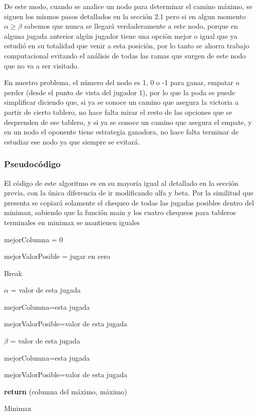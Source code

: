 \documentclass[A4paper,oneside,fleqn,11pt]{article}
\theoremstyle{definition}
\begin{document}
De este modo, cuando se analice un nodo para determinar el camino máximo, se siguen los mismos pasos detallados en la sección 2.1 pero si en algun momento $\alpha \geq \beta$ sabemos que nunca se llegará verdaderamente a este nodo, porque en alguna jugada anterior algún jugador tiene una opción mejor o igual que ya estudió en su totalidad que venir a esta posición, por lo tanto se ahorra trabajo computacional evitando el análisis de todas las ramas que surgen de este nodo que no va a ser visitado.

En nuestro problema, el número del nodo es 1, 0 o -1 para ganar, empatar o perder (desde el punto de vista del jugador 1), por lo que la poda se puede simplificar diciendo que, si ya se conoce un camino que asegura la victoria a partir de cierto tablero, no hace falta mirar el resto de las opciones que se desprenden de ese tablero, y si ya se conoce un camino que asegura el empate, y en un nodo el oponente tiene estrategia ganadora, no hace falta terminar de estudiar ese nodo ya que siempre se evitará.



\subsubsection{Pseudocódigo}
El código de este algoritmo es en su mayoría igual al detallado en la sección previa, con la única diferencia de ir modificando alfa y beta. Por la similitud que presenta se copiará solamente el chequeo de todas las jugadas posibles dentro del minimax, sabiendo que la función main y los cuatro chequeos para tableros terminales en minimax se mantienen iguales

\newpage

\begin{algorithm}



		mejorColumna = 0

		mejorValorPosible = jugar en cero

			{
				\If{ $\alpha >= \beta$}				
					{
					Break
					}

					{
		  	  			{
						$\alpha$ = valor de esta jugada

						mejorColumna=esta jugada

						mejorValorPosible=valor de esta jugada
						}
					}
					{
		  	  			{
						$\beta$ = valor de esta jugada

						mejorColumna=esta jugada

						mejorValorPosible=valor de esta jugada
						}
					}
			}
		\textbf{return} (columna del máximo, máximo)
		

\caption{Minimax}
\end{algorithm}
\end{document}
